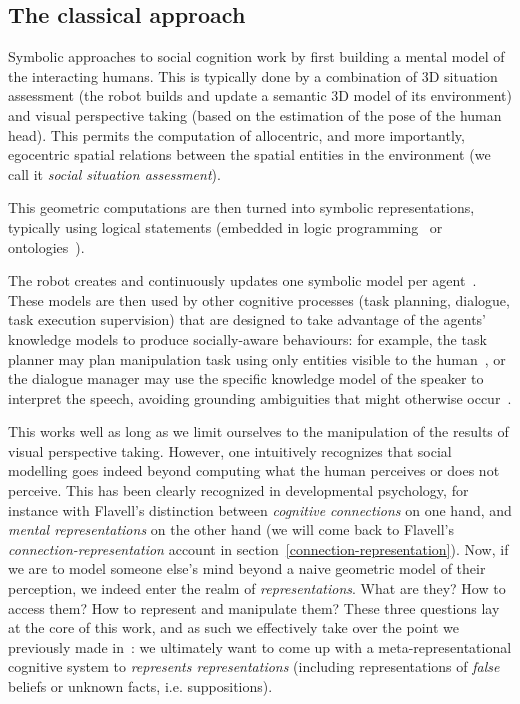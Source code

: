\documentclass[a4paper]{article}
\newcommand{\ie}{i.e.\xspace}
\begin{document}
\subsection{The classical approach}


Symbolic approaches to social cognition work by first building a mental model of the
interacting humans. This is typically done by a combination of 3D situation
assessment (the robot builds and update a semantic 3D model of its environment)
and visual perspective taking (based on the estimation of the pose of the human
head). This permits the computation of allocentric, and more importantly,
egocentric spatial relations between the spatial entities in the environment
(we call it \emph{social situation assessment}).

This geometric computations are then turned into symbolic representations,
typically using logical statements (embedded in logic
programming~\cite{tenorth2009knowrob} or ontologies~\cite{lemaignan2010oro}).

The robot creates and continuously updates one symbolic model per
agent~\cite{lemaignan2010oro}. These models are then used by other cognitive
processes (task planning, dialogue, task execution supervision) that are
designed to take advantage of the agents' knowledge models to produce
socially-aware behaviours: for example, the task planner may plan manipulation
task using only entities visible to the human~\cite{lallement2014hatp}, or the
dialogue manager may use the specific knowledge model of the speaker to
interpret the speech, avoiding grounding ambiguities that might otherwise
occur~\cite{lemaignan2011grounding}.

This works well as long as we limit ourselves to the manipulation of the results
of visual perspective taking. However, one intuitively recognizes that social
modelling goes indeed beyond computing what the human perceives or does not
perceive. This has been clearly recognized in developmental psychology, for
instance with Flavell's distinction between \emph{cognitive connections} on one
hand, and \emph{mental representations} on the other hand (we will come back to
Flavell's \emph{connection-representation} account in
section~\ref{connection-representation}). Now, if we are to model someone else's
mind beyond a naive geometric model of their perception, we indeed enter the
realm of \emph{representations}. What are they? How to access them? How to
represent and manipulate them? These three questions lay at the core of this
work, and as such we effectively take over the point we previously made
in~\cite{lemaignan2015mutual}:  we ultimately want to come up with a
meta-representational cognitive system to \emph{represents
representations} (including representations of \emph{false} beliefs or unknown
facts, \ie suppositions).
\end{document}
